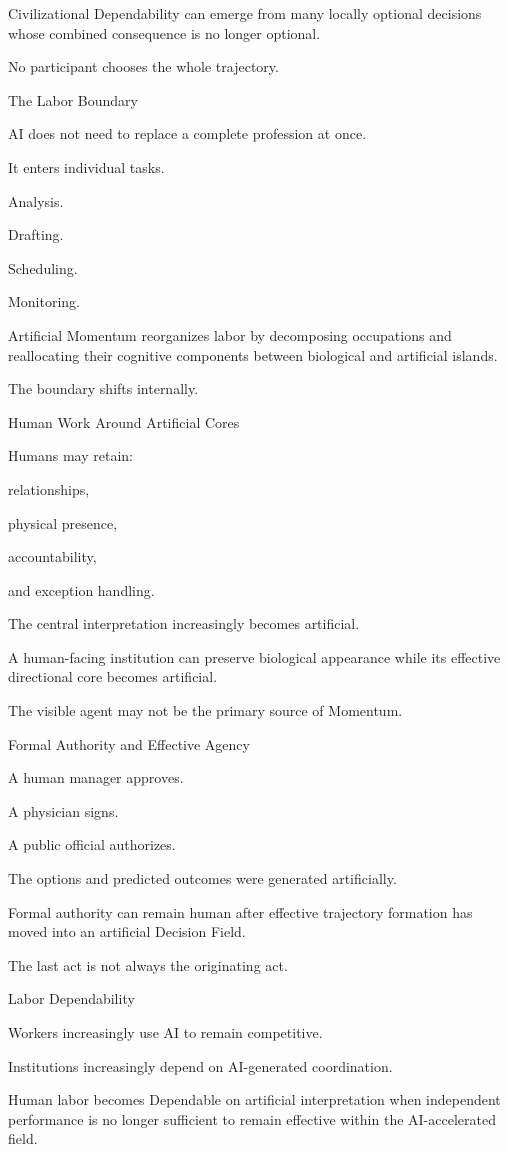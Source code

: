 Civilizational Dependability can emerge from many locally optional decisions whose combined consequence is no longer optional.

No participant chooses the whole trajectory.

The Labor Boundary

AI does not need to replace a complete profession at once.

It enters individual tasks.

Analysis.

Drafting.

Scheduling.

Monitoring.

Artificial Momentum reorganizes labor by decomposing occupations and reallocating their cognitive components between biological and artificial islands.

The boundary shifts internally.

Human Work Around Artificial Cores

Humans may retain:

relationships,

physical presence,

accountability,

and exception handling.

The central interpretation increasingly becomes artificial.

A human-facing institution can preserve biological appearance while its effective directional core becomes artificial.

The visible agent may not be the primary source of Momentum.

Formal Authority and Effective Agency

A human manager approves.

A physician signs.

A public official authorizes.

The options and predicted outcomes were generated artificially.

Formal authority can remain human after effective trajectory formation has moved into an artificial Decision Field.

The last act is not always the originating act.

Labor Dependability

Workers increasingly use AI to remain competitive.

Institutions increasingly depend on AI-generated coordination.

Human labor becomes Dependable on artificial interpretation when independent performance is no longer sufficient to remain effective within the AI-accelerated field.

